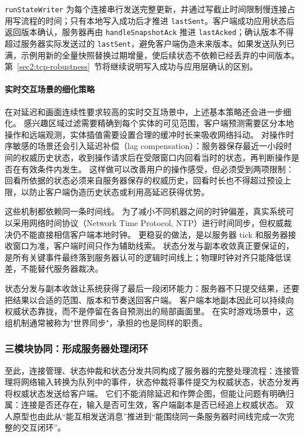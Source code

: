 \texttt{runStateWriter} 为每个连接串行发送完整更新，并通过写截止时间限制慢连接占用写流程的时间；只有本地写入成功后才推进 \texttt{lastSent}。客户端成功应用状态后返回版本确认，服务器再由 \texttt{handleSnapshotAck} 推进 \texttt{lastAcked}；确认版本不得超过服务器实际发送过的 \texttt{lastSent}，避免客户端伪造未来版本。如果发送队列已满，示例用新的全量快照替换过期增量，使后续状态不依赖已经丢弃的中间版本。第~\ref{sec2:tcp-robustness}~节将继续说明写入成功与应用层确认的区别。

\paragraph{实时交互场景的细化策略}

在对延迟和画面连续性要求较高的实时交互场景中，上述基本策略还会进一步细化。
感兴趣区域过滤需要精确到每个实体的可见范围，客户端预测需要区分本地操作和远端观测，实体插值需要设置合理的缓冲时长来吸收网络抖动。
对操作时序敏感的场景还会引入延迟补偿（lag compensation）：服务器保存最近一小段时间的权威历史状态，收到操作请求后在受限窗口内回看当时的状态，再判断操作是否在有效条件内发生。
这样做可以改善用户的操作感受，但必须受到两项限制：回看所依据的状态必须来自服务器保存的权威历史，回看时长也不得超过预设上限，以防止客户端伪造历史状态或利用高延迟获得优势。

这些机制都依赖同一条时间线。
为了减小不同机器之间的时钟偏差，真实系统可以采用网络时间协议（Network Time Protocol, NTP）进行时间同步，但权威裁决仍不能直接相信客户端本地时钟。
更稳妥的做法，是以服务器 tick 和服务器接收窗口为准，客户端时间只作为辅助线索。
状态分发与副本收敛真正要保证的，是所有关键事件最终落到服务器认可的逻辑时间线上；物理时钟对齐只能降低误差，不能替代服务器裁决。

状态分发与副本收敛让系统获得了最后一段闭环能力：服务器不只提交结果，还要把结果以合适的范围、版本和节奏送回客户端。
客户端本地副本因此可以持续向权威状态靠拢，而不是停留在各自预测出的局部画面里。
在实时游戏场景中，这组机制通常被称为"世界同步"，承担的也是同样的职责。

\subsubsection{三模块协同：形成服务器处理闭环}\label{sec2:module-loop}

至此，连接管理、状态仲裁和状态分发共同构成了服务器的完整处理流程：连接管理将网络输入转换为队列中的事件，状态仲裁将事件提交为权威状态，状态分发再将权威状态发送给客户端。
它们不能消除延迟和作弊企图，但能让问题有明确归属：连接是否还存在，输入是否可生效，客户端副本是否已经追上权威状态。
双人原型也由此从“能互相发送消息”推进到“能围绕同一条服务器时间线完成一次完整的交互闭环”。

